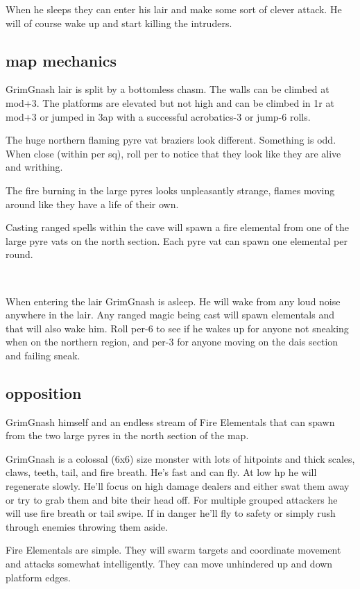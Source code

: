 When he sleeps they can enter his lair and make some sort of clever attack. He will of course wake up and start killing the intruders.


\subsection*{map mechanics}

GrimGnash lair is split by a bottomless chasm. The walls can be climbed at mod+3. The platforms are elevated but not high and can be climbed in 1r at mod+3 or jumped in 3ap with a successful acrobatics-3 or jump-6 rolls. 

The huge northern flaming pyre vat braziers look different. Something is odd. When close (within per sq), roll per to notice that they look like they are alive and writhing. 
\begin{readoutloud}
The fire burning in the large pyres looks unpleasantly strange, flames moving around like they have a life of their own.
\end{readoutloud}
Casting ranged spells within the cave will spawn a fire elemental from one of the large pyre vats on the north section. Each pyre vat can spawn one elemental per round.

\

When entering the lair GrimGnash is asleep. He will wake from any loud noise anywhere in the lair. Any ranged magic being cast will spawn elementals and that will also wake him. Roll per-6 to see if he wakes up for anyone not sneaking when on the northern region, and per-3 for anyone moving on the dais section and failing sneak.


\subsection*{opposition}

GrimGnash himself and an endless stream of Fire Elementals that can spawn from the two large pyres in the north section of the map.

GrimGnash is a colossal (6x6) size monster with lots of hitpoints and thick scales, claws, teeth, tail, and fire breath. He's fast and can fly. At low hp he will regenerate slowly. He'll focus on high damage dealers and either swat them away or try to grab them and bite their head off. For multiple grouped attackers he will use fire breath or tail swipe. If in danger he'll fly to safety or simply rush through enemies throwing them aside.

Fire Elementals are simple. They will swarm targets and coordinate movement and attacks somewhat intelligently. They can move unhindered up and down platform edges.

